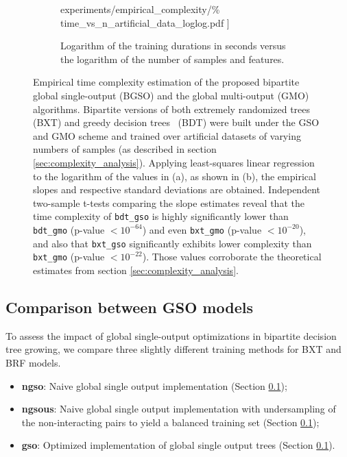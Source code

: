 \begin{figure}[h]
\begin{subfigure}{0.49\textwidth}
{            experiments/empirical\_complexity/\%
            time\_vs\_n\_artificial\_data\_loglog.pdf
        ]}
        \caption{Logarithm of the training durations in seconds versus the logarithm of the number of samples and features.}
    \end{subfigure}
    \caption{
        Empirical time complexity estimation of the proposed bipartite global single-output (BGSO) and the global multi-output (GMO)~\cite{pliakos2018}
        algorithms. Bipartite versions of both extremely randomized trees~\cite{geurts2006extremely} (BXT) and greedy decision trees~\cite{breiman1984} (BDT) were built under the GSO and GMO scheme and trained over artificial datasets of varying numbers of samples (as described in section \ref{sec:complexity_analysis}). Applying least-squares linear regression to the logarithm of the values in (a), as shown in (b), the empirical slopes and respective standard deviations are obtained.
        Independent two-sample t-tests comparing the slope estimates reveal that the time complexity of \texttt{bdt\_gso} is highly significantly lower than \texttt{bdt\_gmo} (p-value $< 10^{-64}$) and even \texttt{bxt\_gmo} (p-value $< 10^{-20}$), and also that \texttt{bxt\_gso} significantly exhibits lower complexity than \texttt{bxt\_gmo} (p-value $< 10^{-22}$). Those values
        corroborate the theoretical estimates from section \ref{sec:complexity_analysis}.
    }
    \label{fig:empirical_complexity}
\end{figure}


\subsection{Comparison between GSO models}  %

To assess the impact of global single-output optimizations in bipartite decision tree growing, we compare three slightly different training methods for BXT and BRF models.

\begin{itemize}
    \item \textbf{ngso}: Naive global single output implementation (Section \ref{});
    \item \textbf{ngsous}: Naive global single output implementation with undersampling of the non-interacting pairs to yield a balanced training set (Section \ref{});
    \item \textbf{gso}: Optimized implementation of global single output trees (Section \ref{}).
\end{itemize}

